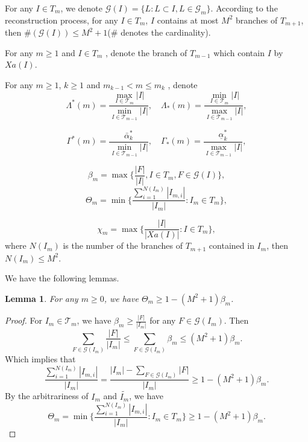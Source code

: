 \documentclass[reqno]{amsart}
\theoremstyle{plain}
\newtheorem{lem}{Lemma}
\theoremstyle{definition}
\theoremstyle{remark}
\numberwithin{equation}{section} \DeclareMathOperator\intr{int}
\begin{document}
For any  $I\in T_m$, we denote $\mathcal{G}(I)=\{L:L\subset I, L\in\mathcal{G}_m\}$.
According to the reconstruction process, for any $I\in T_m$, $I$ contains at most $M^2$ branches of $T_{m+1}$, then $\#(\mathcal{G}(I))\le M^2+1$($\#$ denotes the cardinality).

For any $m\ge 1$ and $I\in T_m$ , denote the branch of $T_{m-1}$ which contain $I$ by $Xa(I)$.


For any  $m\ge1$, $k\ge 1$ and $m_{k-1}< m\le m_{k}$ , denote
$$\Lambda^*(m)=\frac{\max_{I\in \mathcal{T}_m }\left | I \right | }{\min_{I\in \mathcal{T}_{m-1} }\left | I \right |},\quad \Lambda_*(m)=\frac{\min_{I\in \mathcal{T}_m }\left | I \right | }{\max_{I\in \mathcal{T}_{m-1} }\left | I \right |},
 $$

$$\Gamma^*(m)=\frac{\bar{\alpha}^*_k}{\min_{I\in \mathcal{T}_{m-1} }\left | I \right |},\quad
\Gamma_*(m)=\frac{\underline{\alpha}^*_k}{\max_{I\in \mathcal{T}_{m-1} }\left | I \right |},
 $$

$$\beta_m=\max\{\frac{\left | F \right |}{\left | I \right |}, I\in T_m, F\in \mathcal{G}(I)\},$$
$$\Theta_m=\min \{\frac{\sum_{i=1}^{N(I_m)} \left | I_{m,i} \right |}{\left | I_m \right | }:I_m\in T_m\},$$

$$\chi_m=\max\{\frac{\left | I \right | }{\left | Xa(I) \right | }:I\in T_m\},$$
where $N(I_{m})$ is the number of the branches of $T_{m+1}$ contained in $I_{m}$, then $N(I_{m})\le M^{2}$.








We have the following lemmas.
\begin{lem}\label{l8}
For any $m\ge0$, we have $\Theta_m\ge 1-(M^2+1)\beta_m$.
\end{lem}
\begin{proof}
For $I_m\in \mathcal{T}_m$, we have
$\beta_m\ge\frac{\left | F \right | }{\left | I_m \right | } $ for any $F\in \mathcal{G}(I_m)$. Then
\begin{equation*}
\sum_{F\in \mathcal{G}(I_m) } \frac{\left | F \right | }{\left | I_m \right | } \le \sum_{F\in \mathcal{G}(I_m) }\beta_m\le(M^2+1)\beta_m.
\end{equation*}
Which implies that
\begin{equation*}
\frac{\sum_{i=1}^{N(I_m)}\left | I_{m,i} \right | }{\left | I_m \right | }=\frac{\left | I_{m} \right |- \sum_{F\in \mathcal{G}(I_m)} \left | F \right |   }{\left | I_m \right | }\ge1-(M^2+1)\beta_m.
\end{equation*}
By the arbitrariness of $I_m$ and $\tilde{I_m}$, we have
\begin{equation*}
\Theta_m=\min \{\frac{\sum_{i=1}^{N(I_m)} \left | I_{m,i} \right |}{\left | I_m \right | }:I_m\in T_m\}\ge 1-(M^2+1)\beta_m.
\end{equation*}



\end{proof}
\end{document}
